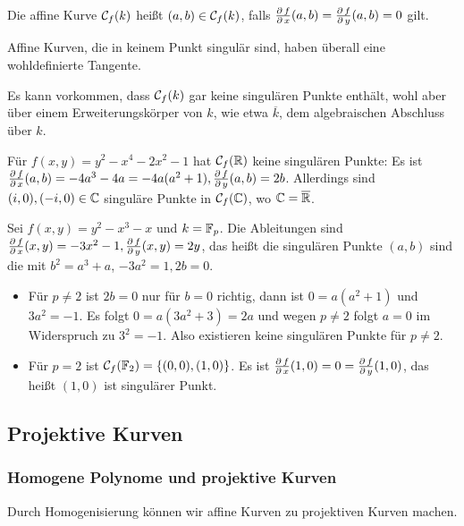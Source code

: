 \begin{defn}
	Die affine Kurve $\mathcal{C}_f(k)$ heißt  $(a,b) \in \mathcal{C}_f(k)$, falls $\frac{\operatorname{\partial} f}{\operatorname{\partial} x}(a,b) = \frac{\operatorname{\partial} f}{\operatorname{\partial} y}(a,b) = 0$ gilt. 
\end{defn}

\begin{bem}
	Affine Kurven, die in keinem Punkt singulär sind, haben überall eine wohldefinierte Tangente.
\end{bem}

\begin{bem}
	Es kann vorkommen, dass $\mathcal{C}_f(k)$ gar keine singulären Punkte enthält, wohl aber über einem Erweiterungskörper von $k$, wie etwa $\overline{k}$, dem algebraischen Abschluss über $k$.
\end{bem}

\begin{bsp}
	Für $f(x,y) = y^2 - x^4 - 2x^2 - 1$ hat $\mathcal{C}_f(\mathbb{R})$ keine singulären Punkte: Es ist $\frac{\operatorname{\partial} f}{\operatorname{\partial} x}(a,b) = -4a^3 - 4a = -4a(a^2+1), \frac{\operatorname{\partial} f}{\operatorname{\partial} y}(a,b) = 2b$. Allerdings sind $(i,0),(-i,0) \in \mathbb{C}$ singuläre Punkte in $\mathcal{C}_f(\mathbb{C})$, wo $\mathbb{C} = \overline{\mathbb{R}}$.
\end{bsp}

\begin{bsp}
	Sei $f(x,y) = y^2 - x^3 - x$ und $k = \mathbb{F}_p$. Die Ableitungen sind $\frac{\operatorname{\partial} f}{\operatorname{\partial} x} (x,y) = -3x^2-1, \frac{\operatorname{\partial} f}{\operatorname{\partial} y}(x,y) = 2y$, das heißt die singulären Punkte $(a,b)$ sind die mit $b^2 = a^3 + a$, $-3a^2 = 1, 2b=0$.\begin{itemize}
		\item Für $p \neq 2$ ist $2b = 0$ nur für $b = 0$ richtig, dann ist $0 = a(a^2+1)$ und $3a^2 = -1$. Es folgt $0 = a(3a^2 + 3) = 2a$ und wegen $p \neq 2$ folgt $a = 0$ im Widerspruch zu $3^2=-1$. Also existieren keine singulären Punkte für $p \neq 2$.
		\item Für $p = 2$ ist $\mathcal{C}_f(\mathbb{F}_2) = \{(0,0),(1,0)\}$. Es ist $\frac{\operatorname{\partial} f}{\operatorname{\partial} x} (1,0) = 0 = \frac{\operatorname{\partial} f}{\operatorname{\partial} y}(1,0)$, das heißt $(1,0)$ ist singulärer Punkt.
	\end{itemize}
\end{bsp}

\nextlecture
\subsection{Projektive Kurven}
\subsubsection{Homogene Polynome und projektive Kurven}
\label{sub:2.3} \label{subsub:2.3.1}
	Durch Homogenisierung können wir affine Kurven zu projektiven Kurven machen. \marginnote{[9]}
	
